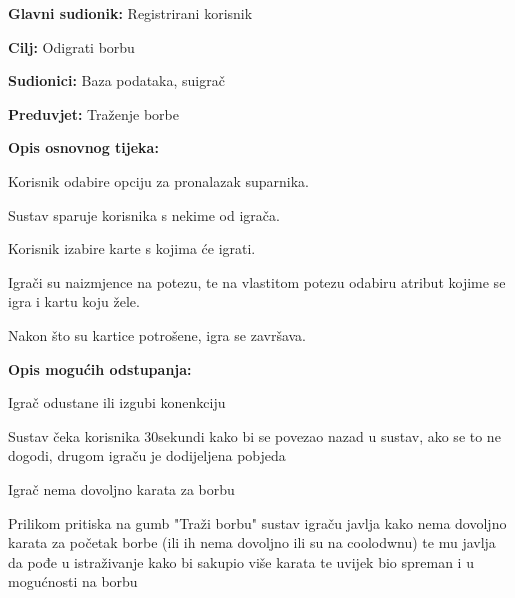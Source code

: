 \noindent {}
\begin{packed_item}
	
	\item \textbf{Glavni sudionik: }Registrirani korisnik
	\item  \textbf{Cilj:} Odigrati borbu
	\item  \textbf{Sudionici:} Baza podataka, suigrač
	\item  \textbf{Preduvjet:} Traženje borbe
	\item  \textbf{Opis osnovnog tijeka:}
	
	\item[] \begin{packed_enum}
		
		\item Korisnik odabire opciju za pronalazak suparnika.
		\item Sustav sparuje korisnika s nekime od igrača.
		\item Korisnik izabire karte s kojima će igrati.
		\item Igrači su naizmjence na potezu, te na vlastitom potezu odabiru atribut kojime se igra i kartu koju žele.
		\item Nakon što su kartice potrošene, igra se završava.
	\end{packed_enum}
	
	\item  \textbf{Opis mogućih odstupanja:}
	
	\item[] \begin{packed_item}
		
		\item[1.a] Igrač odustane ili izgubi konenkciju
		\item[] \begin{packed_enum}
			
			\item  Sustav čeka korisnika 30sekundi kako bi se povezao nazad u sustav, ako se to ne dogodi, drugom igraču je dodijeljena pobjeda
			
		\end{packed_enum}
	\item[2.a] Igrač nema dovoljno karata za borbu
	\item[] \begin{packed_enum}
		
		\item  Prilikom pritiska na gumb "Traži borbu" sustav igraču javlja kako nema dovoljno karata za početak borbe (ili ih nema dovoljno ili su na coolodwnu) te mu javlja da pođe u istraživanje kako bi sakupio više karata te uvijek bio spreman i u mogućnosti na borbu
		
	\end{packed_enum}
		
	\end{packed_item}
\end{packed_item}

